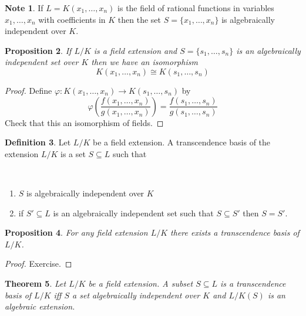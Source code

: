 \documentclass[12pt, letterpaper, oneside]{article}
\theoremstyle{plain}
\newtheorem{theorem}{Theorem}[section]
\newtheorem{proposition}[theorem]{Proposition}
\theoremstyle{definition}
\newtheorem{definition}[theorem]{Definition}
\newtheorem{note}[theorem]{Note}
\newcommand{\benu}{\begin{enumerate}}
\newcommand{\eenu}{\end{enumerate}}
\newcommand{\vs}{\vskip 5mm}
\newcommand{\isep}[1][0]{\setlength{\itemsep}{#1 mm}}
\begin{document}
\vs\vs

\begin{note}
If $L=K(x_{1}, \dots, x_{n})$ is the field of rational functions in variables $x_{1}, \dots, x_{n}$
with coefficients in $K$ then the set $S= \{x_{1}, \dots, x_{n}\}$ is algebraically independent over $K$. 
\end{note}


\vs\vs

\begin{proposition}
If $L/K$ is a field extension and $S= \{s_{1}, \dots, s_{n}\}$ is an algebraically independent 
set over $K$ then we have an isomorphism 
$$K(x_{1}, \dots, x_{n}) \cong K(s_{1}, \dots, s_{n})$$
\end{proposition}

\vs

\begin{proof}
Define $\varphi \colon K(x_{1}, \dots, x_{n}) \to K(s_{1}, \dots, s_{n})$ by
$$\varphi\left(\frac{f(x_{1}, \dots, x_{n})}{g(x_{1}, \dots, x_{n})}\right) = 
\frac{f(s_{1}, \dots, s_{n})}{g(s_{1}, \dots, s_{n})}$$
Check that this an isomorphism of fields. 
\end{proof}



\vs\vs


\begin{definition}
Let  $L/K$ be a field extension. A transcendence basis of the extension $L/K$ is a set $S\subseteq L$
such that 

\vskip -13mm

\ 
\benu
\isep[0]
\item $S$ is algebraically independent over $K$
\item if  $S'\subseteq L$ is an algebraically independent set such that $S\subseteq S'$ then 
$S= S'$. 
\eenu
 
\end{definition}


\vs\vs

\begin{proposition}
For any field extension $L/K$  there exists a transcendence basis of $L/K$. 
\end{proposition}


\vs

\begin{proof}
Exercise. 
\end{proof}


\vs\vs


\begin{theorem}
\label{THM_TRANSCBASISALGEXT}
Let $L/K$ be a field extension. A subset $S\subseteq L$ is a transcendence basis of $L/K$
iff   $S$ a set algebraically independent over $K$ and $L/K(S)$ is an algebraic extension. 
\end{theorem}
\end{document}
